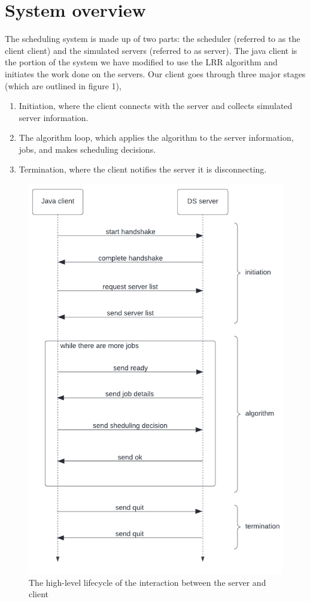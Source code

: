 \documentclass[a4paper]{article} %
\begin{document}
\section{System overview}
\label{sec:section2}

The scheduling system is made up of two parts: the scheduler (referred to as the client client) and the simulated servers (referred to as server). The java client is the portion of the system we have modified to use the LRR algorithm and initiates the work done on the servers. Our client goes through three major stages (which are outlined in figure 1), \begin{enumerate}
    \item Initiation, where the client connects with the server and collects simulated server information.
    \item The algorithm loop, which applies the algorithm to the server information, jobs, and makes scheduling decisions.
    \item Termination, where the client notifies the server it is disconnecting.
\end{enumerate}
\begin{figure}
    \centering
    \includegraphics{over.png}
    \caption{The high-level lifecycle of the interaction between the server and client}
    \label{fig:overview}
\end{figure}
\end{document}
